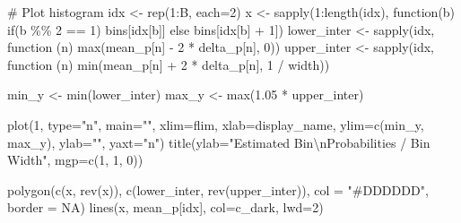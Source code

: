 \documentclass[
  letterpaper,
  DIV=11,
  numbers=noendperiod]{scrartcl}
\newenvironment{Shaded}{\begin{snugshade}}{\end{snugshade}}
\newcommand{\AttributeTok}[1]{\textcolor[rgb]{0.40,0.45,0.13}{#1}}
\newcommand{\CommentTok}[1]{\textcolor[rgb]{0.37,0.37,0.37}{#1}}
\newcommand{\ConstantTok}[1]{\textcolor[rgb]{0.56,0.35,0.01}{#1}}
\newcommand{\ControlFlowTok}[1]{\textcolor[rgb]{0.00,0.23,0.31}{#1}}
\newcommand{\DecValTok}[1]{\textcolor[rgb]{0.68,0.00,0.00}{#1}}
\newcommand{\FloatTok}[1]{\textcolor[rgb]{0.68,0.00,0.00}{#1}}
\newcommand{\FunctionTok}[1]{\textcolor[rgb]{0.28,0.35,0.67}{#1}}
\newcommand{\NormalTok}[1]{\textcolor[rgb]{0.00,0.23,0.31}{#1}}
\newcommand{\OtherTok}[1]{\textcolor[rgb]{0.00,0.23,0.31}{#1}}
\newcommand{\SpecialCharTok}[1]{\textcolor[rgb]{0.37,0.37,0.37}{#1}}
\newcommand{\StringTok}[1]{\textcolor[rgb]{0.13,0.47,0.30}{#1}}
\begin{document}
\begin{Shaded}
\begin{Highlighting}[]
  \CommentTok{\# Plot histogram}
\NormalTok{  idx }\OtherTok{\textless{}{-}} \FunctionTok{rep}\NormalTok{(}\DecValTok{1}\SpecialCharTok{:}\NormalTok{B, }\AttributeTok{each=}\DecValTok{2}\NormalTok{)}
\NormalTok{  x }\OtherTok{\textless{}{-}} \FunctionTok{sapply}\NormalTok{(}\DecValTok{1}\SpecialCharTok{:}\FunctionTok{length}\NormalTok{(idx), }\ControlFlowTok{function}\NormalTok{(b) }\ControlFlowTok{if}\NormalTok{(b }\SpecialCharTok{\%\%} \DecValTok{2} \SpecialCharTok{==} \DecValTok{1}\NormalTok{) bins[idx[b]]}
              \ControlFlowTok{else}\NormalTok{ bins[idx[b] }\SpecialCharTok{+} \DecValTok{1}\NormalTok{])}
\NormalTok{  lower\_inter }\OtherTok{\textless{}{-}} \FunctionTok{sapply}\NormalTok{(idx, }\ControlFlowTok{function}\NormalTok{ (n)}
    \FunctionTok{max}\NormalTok{(mean\_p[n] }\SpecialCharTok{{-}} \DecValTok{2} \SpecialCharTok{*}\NormalTok{ delta\_p[n], }\DecValTok{0}\NormalTok{))}
\NormalTok{  upper\_inter }\OtherTok{\textless{}{-}} \FunctionTok{sapply}\NormalTok{(idx, }\ControlFlowTok{function}\NormalTok{ (n)}
    \FunctionTok{min}\NormalTok{(mean\_p[n] }\SpecialCharTok{+} \DecValTok{2} \SpecialCharTok{*}\NormalTok{ delta\_p[n], }\DecValTok{1} \SpecialCharTok{/}\NormalTok{ width))}
  
\NormalTok{  min\_y }\OtherTok{\textless{}{-}} \FunctionTok{min}\NormalTok{(lower\_inter)}
\NormalTok{  max\_y }\OtherTok{\textless{}{-}} \FunctionTok{max}\NormalTok{(}\FloatTok{1.05} \SpecialCharTok{*}\NormalTok{ upper\_inter)}
  
  \FunctionTok{plot}\NormalTok{(}\DecValTok{1}\NormalTok{, }\AttributeTok{type=}\StringTok{"n"}\NormalTok{, }\AttributeTok{main=}\StringTok{""}\NormalTok{,}
       \AttributeTok{xlim=}\NormalTok{flim, }\AttributeTok{xlab=}\NormalTok{display\_name,}
       \AttributeTok{ylim=}\FunctionTok{c}\NormalTok{(min\_y, max\_y), }\AttributeTok{ylab=}\StringTok{""}\NormalTok{, }\AttributeTok{yaxt=}\StringTok{"n"}\NormalTok{)}
  \FunctionTok{title}\NormalTok{(}\AttributeTok{ylab=}\StringTok{"Estimated Bin}\SpecialCharTok{\textbackslash{}n}\StringTok{Probabilities / Bin Width"}\NormalTok{, }\AttributeTok{mgp=}\FunctionTok{c}\NormalTok{(}\DecValTok{1}\NormalTok{, }\DecValTok{1}\NormalTok{, }\DecValTok{0}\NormalTok{))}
  
  \FunctionTok{polygon}\NormalTok{(}\FunctionTok{c}\NormalTok{(x, }\FunctionTok{rev}\NormalTok{(x)), }\FunctionTok{c}\NormalTok{(lower\_inter, }\FunctionTok{rev}\NormalTok{(upper\_inter)),}
          \AttributeTok{col =} \StringTok{"\#DDDDDD"}\NormalTok{, }\AttributeTok{border =} \ConstantTok{NA}\NormalTok{)}
  \FunctionTok{lines}\NormalTok{(x, mean\_p[idx], }\AttributeTok{col=}\NormalTok{c\_dark, }\AttributeTok{lwd=}\DecValTok{2}\NormalTok{)}
  

\end{Highlighting}
\end{Shaded}
\end{document}
